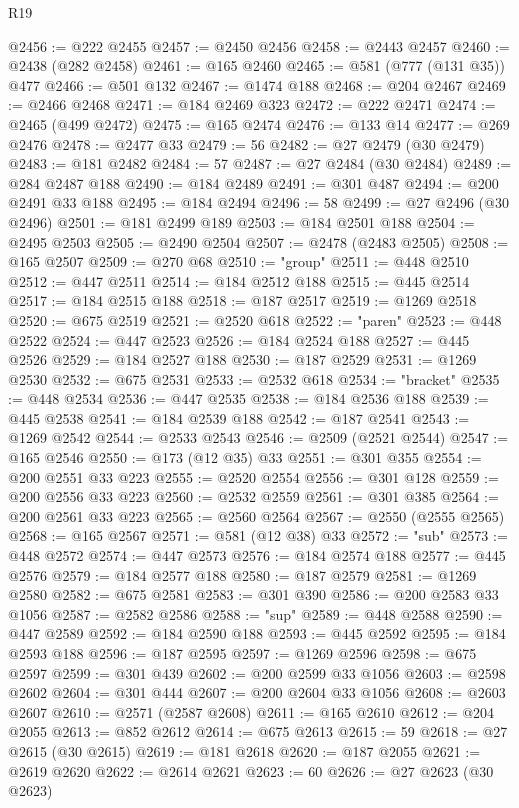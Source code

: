 \begin{lexlean}{R19}
\begin{coremodule}
@2456 := @222 @2455
@2457 := @2450 @2456
@2458 := @2443 @2457
@2460 := @2438 (@282 @2458)
@2461 := @165 @2460
@2465 := @581 (@777 (@131 @35)) @477
@2466 := @501 @132
@2467 := @1474 @188
@2468 := @204 @2467
@2469 := @2466 @2468
@2471 := @184 @2469 @323
@2472 := @222 @2471
@2474 := @2465 (@499 @2472)
@2475 := @165 @2474
@2476 := @133 @14
@2477 := @269 @2476
@2478 := @2477 @33
@2479 := 56
@2482 := @27 @2479 (@30 @2479)
@2483 := @181 @2482
@2484 := 57
@2487 := @27 @2484 (@30 @2484)
@2489 := @284 @2487 @188
@2490 := @184 @2489
@2491 := @301 @487
@2494 := @200 @2491 @33 @188
@2495 := @184 @2494
@2496 := 58
@2499 := @27 @2496 (@30 @2496)
@2501 := @181 @2499 @189
@2503 := @184 @2501 @188
@2504 := @2495 @2503
@2505 := @2490 @2504
@2507 := @2478 (@2483 @2505)
@2508 := @165 @2507
@2509 := @270 @68
@2510 := "group"
@2511 := @448 @2510
@2512 := @447 @2511
@2514 := @184 @2512 @188
@2515 := @445 @2514
@2517 := @184 @2515 @188
@2518 := @187 @2517
@2519 := @1269 @2518
@2520 := @675 @2519
@2521 := @2520 @618
@2522 := "paren"
@2523 := @448 @2522
@2524 := @447 @2523
@2526 := @184 @2524 @188
@2527 := @445 @2526
@2529 := @184 @2527 @188
@2530 := @187 @2529
@2531 := @1269 @2530
@2532 := @675 @2531
@2533 := @2532 @618
@2534 := "bracket"
@2535 := @448 @2534
@2536 := @447 @2535
@2538 := @184 @2536 @188
@2539 := @445 @2538
@2541 := @184 @2539 @188
@2542 := @187 @2541
@2543 := @1269 @2542
@2544 := @2533 @2543
@2546 := @2509 (@2521 @2544)
@2547 := @165 @2546
@2550 := @173 (@12 @35) @33
@2551 := @301 @355
@2554 := @200 @2551 @33 @223
@2555 := @2520 @2554
@2556 := @301 @128
@2559 := @200 @2556 @33 @223
@2560 := @2532 @2559
@2561 := @301 @385
@2564 := @200 @2561 @33 @223
@2565 := @2560 @2564
@2567 := @2550 (@2555 @2565)
@2568 := @165 @2567
@2571 := @581 (@12 @38) @33
@2572 := "sub"
@2573 := @448 @2572
@2574 := @447 @2573
@2576 := @184 @2574 @188
@2577 := @445 @2576
@2579 := @184 @2577 @188
@2580 := @187 @2579
@2581 := @1269 @2580
@2582 := @675 @2581
@2583 := @301 @390
@2586 := @200 @2583 @33 @1056
@2587 := @2582 @2586
@2588 := "sup"
@2589 := @448 @2588
@2590 := @447 @2589
@2592 := @184 @2590 @188
@2593 := @445 @2592
@2595 := @184 @2593 @188
@2596 := @187 @2595
@2597 := @1269 @2596
@2598 := @675 @2597
@2599 := @301 @439
@2602 := @200 @2599 @33 @1056
@2603 := @2598 @2602
@2604 := @301 @444
@2607 := @200 @2604 @33 @1056
@2608 := @2603 @2607
@2610 := @2571 (@2587 @2608)
@2611 := @165 @2610
@2612 := @204 @2055
@2613 := @852 @2612
@2614 := @675 @2613
@2615 := 59
@2618 := @27 @2615 (@30 @2615)
@2619 := @181 @2618
@2620 := @187 @2055
@2621 := @2619 @2620
@2622 := @2614 @2621
@2623 := 60
@2626 := @27 @2623 (@30 @2623)

\end{coremodule}
\end{lexlean}
